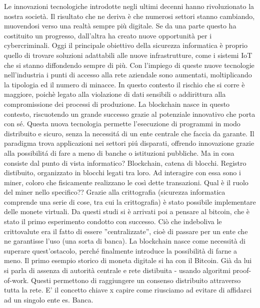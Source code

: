 
Le innovazioni tecnologiche introdotte negli ultimi decenni hanno rivoluzionato la nostra società. Il risultato che ne deriva è che numerosi settori stanno cambiando, muovendosi verso una realtà sempre più digitale. Se da una parte questo ha costituito un progresso, dall'altra ha creato nuove opportunità per i cybercriminali.\newline
Oggi il principale obiettivo della sicurezza informatica è proprio quello di trovare soluzioni adattabili alle nuove infrastrutture, come i sistemi IoT che si stanno diffondendo sempre di più. Con l'impiego di queste nuove tecnologie nell'industria i punti di accesso alla rete aziendale sono aumentati, moltiplicando la tipologia ed il numero di minacce. In questo contesto il rischio che si corre è maggiore, poichè legato alla violazione di dati sensibili o addirittura alla compromissione dei processi di produzione. %
\newline
La blockchain nasce in questo contesto, riscuotendo un grande successo grazie al potenziale innovativo che porta con sé. Questa nuova tecnologia permette l'esecuzione di programmi in modo distribuito e sicuro, senza la necessitá di un ente centrale che faccia da garante. Il paradigma
trova applicazioni nei settori piú disparati, offrendo innovazione grazie alla
possibilitá di fare a meno di banche o istituzioni pubbliche.\newline
Ma in cosa consiste dal punto di vista informatico?
Blockchain, catena di blocchi.
Registro distibuito, organizzato in blocchi legati tra loro. Ad interagire con essa sono i miner, coloro che fisicamente realizzano le così dette transazioni. 
Qual è il ruolo del miner nello specifico??\newline
\newline
Grazie alla crittografia (sicurezza informatica comprende una serie di cose, tra cui la crittografia) è stato possibile implementare delle monete virtuali. Da questi studi si è arrivati poi a pensare al bitcoin, che è stato il primo esperimento condotto con successo.\newline
Ciò che indeboliva le crittovalute era il fatto di essere ''centralizzate'', cioè di passare per un ente che ne garantisse l'uso (una sorta di banca).\newline
La blockchain nasce come necessità di superare quest'ostacolo, perché finalmente introduce la possibilità di farne a meno.
Il primo esempio storico di moneta digitale si ha con il Bitcoin. Già da lui si parla di assenza di autorità centrale e rete distibuita - usando algoritmi proof-of-work. Questi permettono di raggiungere un consenso distribuito attraverso tutta la rete. E' il concetto chiave x capire come riusciamo ad evitare di affidarci ad un singolo ente es. Banca.\newline
